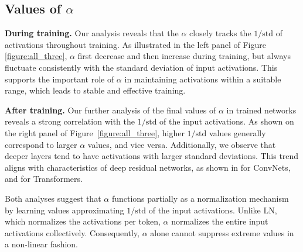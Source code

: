 \documentclass[]{fairmeta}
\renewcommand{\paragraph}[1]{\vspace{1.25mm}\noindent\textbf{#1}}
\begin{document}
\subsection{Values of $\alpha$}

\paragraph{During training.} Our analysis reveals that the $\alpha$ closely tracks the $1/\mathrm{std}$ of activations throughout training. As illustrated in the left panel of Figure \ref{figure:all_three}, $\alpha$ first decrease and then increase during training, but always fluctuate consistently with the standard deviation of input activations. This supports the important role of $\alpha$ in maintaining activations within a suitable range, which leads to stable and effective training.


\paragraph{After training.}
Our further analysis of the final values of $\alpha$ in trained networks reveals a strong correlation with the $1/\mathrm{std}$ of the input activations.
As shown on the right panel of Figure~\ref{figure:all_three}, higher $1/\mathrm{std}$ values generally correspond to larger $\alpha$ values, and vice versa. Additionally, we observe that deeper layers tend to have activations with larger standard deviations. This trend aligns with characteristics of deep residual networks, as shown in \citet{brock2021characterizing} for ConvNets, and \citet{sun2025cursedepthlargelanguage} for Transformers.


Both analyses suggest that $\alpha$ functions partially as a normalization mechanism by learning values approximating $1/\mathrm{std}$ of the input activations. Unlike LN, which normalizes the activations per token, $\alpha$ normalizes the entire input activations collectively. Consequently, $\alpha$ alone cannot suppress extreme values in a non-linear fashion. 
\end{document}
